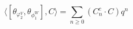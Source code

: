 $$
\langle [\theta_{\varphi^V_{2}}, \theta_{\phi_1^W}], C \rangle  = \sum_{n \geq 0} (C_n^c \cdot C)q^n
$$